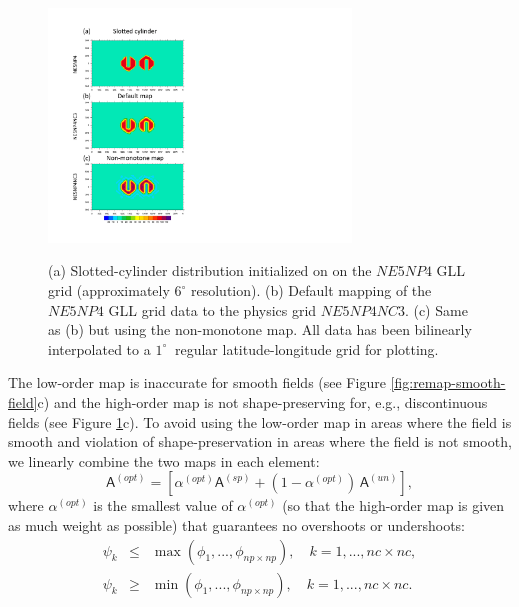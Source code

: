 \documentclass[twocol]{ametsoc}
\begin{document}
\begin{figure}[t]
\noindent\includegraphics[width=19pc,angle=0]{figs/idealized-mapping-tests-slotted-cylinder.pdf}\\
  \caption{(a) Slotted-cylinder distribution initialized on on the $NE5NP4$ GLL grid (approximately $6^\circ$ resolution). (b) Default mapping of the $NE5NP4$ GLL grid data to the physics grid $NE5NP4NC3$. (c) Same as (b) but using the non-monotone map. All data has been bilinearly interpolated to a $1^\circ\
$ regular latitude-longitude grid for plotting.}\label{fig:remap-slotted-cylinder}
\end{figure}
The low-order map is inaccurate for smooth fields (see Figure \ref{fig:remap-smooth-field}c) and the high-order map is not shape-preserving for, e.g., discontinuous fields (see Figure \ref{fig:remap-slotted-cylinder}c). To avoid using the low-order map in areas where the field is smooth and violation of shape-preservation in areas where the field is not smooth, we linearly combine the two maps in each element:
\begin{equation}
\bm{\mathsf{A}}^{(opt)}=\left[ \alpha^{(opt)} \bm{\mathsf{A}}^{(sp)}+(1-\alpha^{(opt)})\, \bm{\mathsf{A}}^{(un)}\right],\label{eq:opt}
\end{equation}
where $\alpha^{(opt)}$ is the smallest value of $\alpha^{(opt)}$ (so that the high-order map is given as much weight as possible) that guarantees no overshoots or undershoots:
\begin{eqnarray}
\psi_k&\le &\max(\phi_1,...,\phi_{np\times np}), \quad k=1,...,nc\times nc,\label{eq:overshoot}\\
\psi_k&\ge &\min(\phi_1,...,\phi_{np\times np}), \quad k=1,...,nc\times nc.\label{eq:undershoot}
\end{eqnarray}
\end{document}
